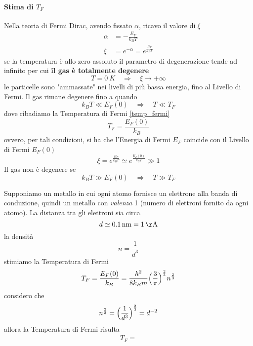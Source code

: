 \paragraph{Stima di $T_F$}
Nella teoria di Fermi Dirac, avendo fissato $\alpha$, ricavo il valore di $\xi$
\begin{equation}
\begin{split}
\alpha & = - \frac{E_F}{k_B T} \\
\xi & = e^{ -\alpha } = e^{ \frac{E_F}{k_B T} }
\end{split}
\end{equation}
se la temperatura è allo zero assoluto il parametro di degenerazione tende ad infinito per cui \textbf{il gas è totalmente degenere}
\begin{equation}
T=\SI{0}{K} \quad\Rightarrow\quad \xi \to + \infty
\end{equation}
le particelle sono "ammassate" nei livelli di più bassa energia, fino al Livello di Fermi.
Il gas rimane degenere fino a quando
\begin{equation}
k_B T \ll E_F(0) \quad\Rightarrow\quad T \ll T_F
\end{equation}
dove ribadiamo la Temperatura di Fermi \ref{temp_fermi}
$$T_F= \frac{E_F(0)}{k_B}$$
ovvero, per tali condizioni, si ha che l'Energia di Fermi $E_F$ coincide con il Livello di Fermi $E_F(0)$
\begin{equation}
\xi = e^{ \frac{E_F}{k_B T} } \simeq e^{ \frac{E_F(0)}{k_B T} } \gg 1
\end{equation}
Il gas non è degenere se
\begin{equation}
k_B T \gg E_F(0) \quad\Rightarrow\quad T \gg T_F
\end{equation}

Supponiamo un metallo in cui ogni atomo fornisce un elettrone alla banda di conduzione, quindi un metallo con \textit{valenza} 1 (numero di elettroni fornito da ogni atomo).
La distanza tra gli elettroni sia circa
\begin{equation}
d \simeq \SI{0.1}{n m} = \SI{1}{\AA}
\end{equation}
la densità
\begin{equation}
n = \frac{1}{d^3}
\end{equation}
stimiamo la Temperatura di Fermi
\begin{equation}
T_F = \frac{E_F(0)}{k_B} = \frac{h^2}{8k_B m} \Bigl(  \frac{3}{\pi}  \Bigr)^{ \frac{2}{3} } n^{ \frac{2}{3} }
\end{equation}
considero che 
\begin{equation}
n^{ \frac{2}{3} } = \Bigl(  \frac{1}{d^3}  \Bigr)^{ \frac{2}{3} } = d^{ -2 }
\end{equation}
allora la Temperatura di Fermi risulta
\begin{equation}
\begin{split}
T_F = 
\end{split}
\end{equation}





